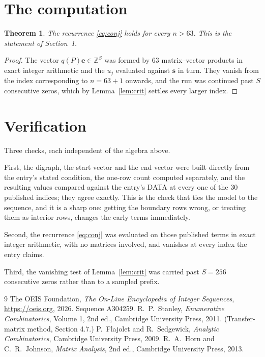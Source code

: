 \documentclass[11pt,a4paper]{article}
\theoremstyle{plain}
\newtheorem{theorem}{Theorem}
\theoremstyle{definition}
\begin{document}
\section{The computation}

\begin{theorem}
The recurrence \eqref{eq:conj} holds for every $n>63$. This is the statement of
Section~1.
\end{theorem}

\begin{proof}
The vector $q(P)\mathbf{e}\in\mathbb{Z}^{S}$ was formed by $63$ matrix--vector
products in exact integer arithmetic and the $u_j$ evaluated against $\mathbf{s}$ in turn.
They vanish from the index corresponding to $n=63+1$ onwards, and the run was continued
past $S$ consecutive zeros, which by Lemma~\ref{lem:crit} settles every larger index.
\end{proof}

\section{Verification}

Three checks, each independent of the algebra above.

First, the digraph, the start vector and the end vector were built directly from the
entry's stated condition, the one-row count computed separately, and the resulting values
compared against the entry's DATA at every one of the $30$ published indices; they
agree exactly. This is the check that ties the model to the sequence, and it is a sharp one:
getting the boundary rows wrong, or treating them as interior rows, changes the early terms
immediately.

Second, the recurrence \eqref{eq:conj} was evaluated on those published terms in exact
integer arithmetic, with no matrices involved, and vanishes at every index the entry claims.

Third, the vanishing test of Lemma~\ref{lem:crit} was carried past $S=256$ consecutive
zeros rather than to a sampled prefix.

\begin{thebibliography}{9}
 The OEIS Foundation, \emph{The On-Line Encyclopedia of Integer
Sequences}, \url{https://oeis.org}, 2026. Sequence A304259.
 R.~P.~Stanley, \emph{Enumerative Combinatorics}, Volume 1, 2nd ed.,
Cambridge University Press, 2011. (Transfer-matrix method, Section 4.7.)
 P.~Flajolet and R.~Sedgewick, \emph{Analytic Combinatorics}, Cambridge
University Press, 2009.
 R.~A.~Horn and C.~R.~Johnson, \emph{Matrix Analysis}, 2nd ed., Cambridge
University Press, 2013.
\end{thebibliography}
\end{document}
